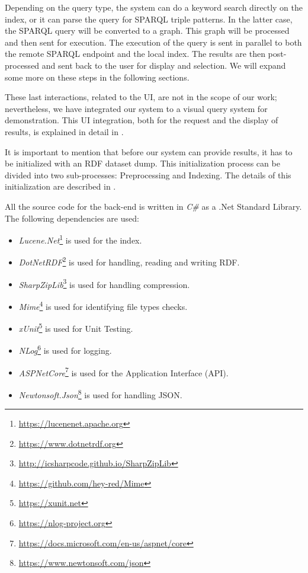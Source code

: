 Depending on the query type, the system can do a keyword search directly on the index, or it can parse the query for SPARQL triple patterns. 
In the latter case, the SPARQL query will be converted to a graph. 
This graph will be processed and then sent for execution. 
The execution of the query is sent in parallel to both the remote SPARQL endpoint and the local index. 
The results are then post-processed and sent back to the user for display and selection. 
We will expand some more on these steps in the following sections.

These last interactions, related to the UI, are not in the scope of our work; nevertheless, we have integrated our system to a visual query system for demonstration. 
This UI integration, both for the request and the display of results, is explained in detail in .

It is important to mention that before our system can provide results, it has to be initialized with an RDF dataset dump. 
This initialization process can be divided into two sub-processes: 
Preprocessing and Indexing. 
The details of this initialization are described in . 

All the source code for the back-end is written in \textit{C\#} as a .Net Standard Library. 
The following dependencies are used:

\begin{itemize}
    \item \textit{Lucene.Net}\footnote{\url{https://lucenenet.apache.org}} is used for the index. 
    \item \textit{DotNetRDF}\footnote{\url{https://www.dotnetrdf.org}} is used for handling, reading and writing RDF.
    \item \textit{SharpZipLib}\footnote{\url{http://icsharpcode.github.io/SharpZipLib}} is used for handling compression.
    \item \textit{Mime}\footnote{\url{https://github.com/hey-red/Mime}} is used for identifying file types checks.
    \item \textit{xUnit}\footnote{\url{https://xunit.net}} is used for Unit Testing.
    \item \textit{NLog}\footnote{\url{https://nlog-project.org}} is used for logging.
    \item \textit{ASPNetCore}\footnote{\url{https://docs.microsoft.com/en-us/aspnet/core}} is used for the Application Interface (API).
    \item \textit{Newtonsoft.Json}\footnote{\url{https://www.newtonsoft.com/json}} is used for handling JSON.
\end{itemize}

